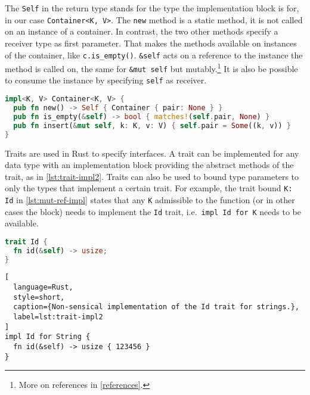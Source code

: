 The \lstinline!Self! in the return type stands for the type the implementation
block is for, in our case \lstinline!Container<K, V>!. The \lstinline!new! method is a
static method, it is not called on an instance of a container. In contrast, the
two other methods specify a receiver type as first parameter. That makes the
methods available on instances of the container, like \lstinline!c.is_empty()!.
\lstinline!&self! acts on a reference to the instance the method is called on,
the same for \lstinline!&mut self! but mutably.\footnote{More on references in
\autoref{references}.} It is also be possible to consume the instance by
specifying \lstinline!self! as receiver.

\begin{lstlisting}[language=Rust, caption={Methods for the running example}, label=lst:impl1]
impl<K, V> Container<K, V> {
  pub fn new() -> Self { Container { pair: None } }
  pub fn is_empty(&self) -> bool { matches!(self.pair, None) }
  pub fn insert(&mut self, k: K, v: V) { self.pair = Some((k, v)) }
}
\end{lstlisting}

Traits are used in Rust to specify interfaces. A trait can be implemented for
any data type with an implementation block providing the abstract methods of the
trait, as in \autoref{lst:trait-impl2}. Traits can also be used to bound type
parameters to only the types that implement a certain trait. For example, the
trait bound \lstinline!K: Id!  in \autoref{lst:mut-ref-impl} states that any
\lstinline!K! admissible to the function (or in other cases the block) needs to
implement the \lstinline!Id! trait, i.e.~\passthrough{\lstinline!impl Id for K!}
needs to be available.

\noindent\begin{minipage}[t]{.45\textwidth}
\begin{lstlisting}[language=Rust, style=short, caption={Rust trait with one method.}, label=lst:trait-impl1]
trait Id {
  fn id(&self) -> usize;
}
\end{lstlisting}
\end{minipage}\hfill
\begin{minipage}[t]{.45\textwidth}
\begin{lstlisting}[
  language=Rust,
  style=short,
  caption={Non-sensical implementation of the Id trait for strings.},
  label=lst:trait-impl2
]
impl Id for String {
  fn id(&self) -> usize { 123456 }
}
\end{lstlisting}
\end{minipage}

